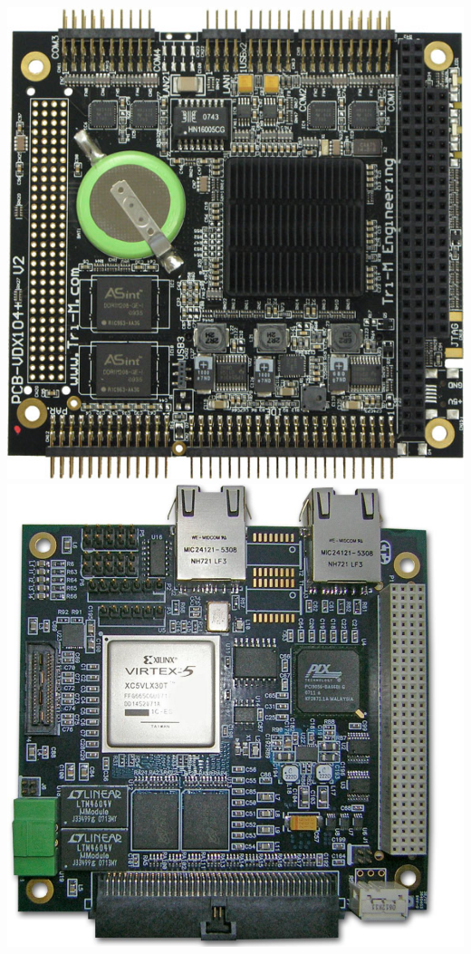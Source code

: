 \documentclass[landscape,xcolor={table}]{beamer}
\begin{document}
\begin{frame}
\begin{columns}[T]
\begin{column}{.30\textwidth}
			\includegraphics[width=\textwidth]{images/vdx104} \\
			\includegraphics[width=\textwidth]{images/fpga}
					
		\end{column}%
		\end{columns}
			

	\end{frame}
	
\end{document}
